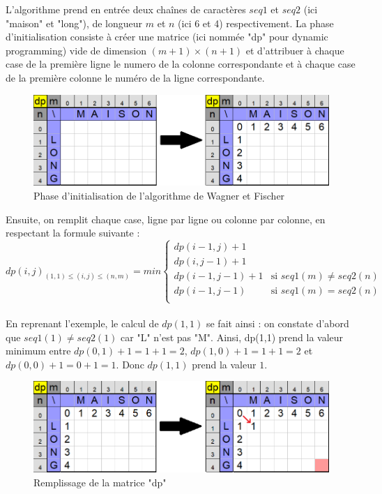 \documentclass[12pt]{article}
\begin{document}
L'algorithme prend en entrée deux chaînes de caractères $seq1$ et $seq2$ (ici "maison" et "long"), de longueur $m$ et $n$ (ici 6 et 4) respectivement. La phase d'initialisation consiste à créer une matrice (ici nommée "dp" pour dynamic programming) vide de dimension $(m+1)\times (n+1)$ et d'attribuer à chaque case de la première ligne le numero de la colonne correspondante et à chaque case de la première colonne le numéro de la ligne correspondante.

\begin{figure}[!h]
    \centering
    \includegraphics[scale = 0.7]{Images/Levenstein/pre init levenstein.png}
    \caption{Phase d'initialisation de l'algorithme de Wagner et Fischer}
    \label{fig:Phase d'initialisation de l'algorithme de Wagner et Fischer}
\end{figure}

Ensuite, on remplit chaque case, ligne par ligne ou colonne par colonne, en respectant la formule suivante :\\

$dp(i,j)_{(1,1)\leq (i,j)\leq (n,m)} = min\left\{
\begin{array}{ll}
dp(i-1,j)+1\\
dp(i,j-1)+1\\
dp(i-1,j-1) +1 & \mbox{si } seq1(m)\neq seq2(n) \\
dp(i-1,j-1) & \mbox{si } seq1(m) = seq2(n) \\
\end{array}
\right.$\\\\

En reprenant l'exemple, le calcul de $dp(1,1)$ se fait ainsi : on constate d'abord que $seq1(1)\neq seq2(1)$ car "L" n'est pas "M". Ainsi, dp(1,1) prend la valeur minimum entre $dp(0,1)+1=1+1=2$, $dp(1,0)+1=1+1=2$ et $dp(0,0)+1=0+1=1$. Donc $dp(1,1)$ prend la valeur $1$.\\

\begin{figure}[!h]
    \centering
    \includegraphics[scale = 0.69]{Images/Levenstein/remplissage levenstein.png}
    \caption{Remplissage de la matrice "dp"}
    \label{fig:Remplissage de la matrice "dp"}
\end{figure}
\end{document}
